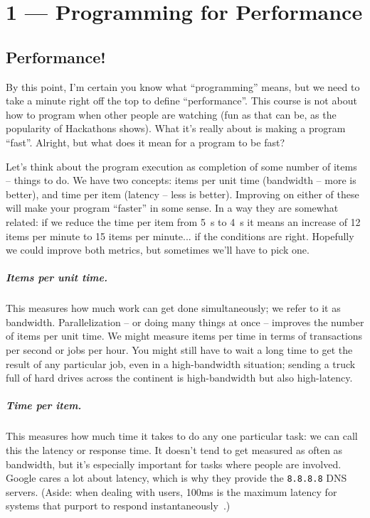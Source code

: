 \documentclass[a4paper]{report}
\begin{document}
\tableofcontents


\chapter*{1 --- Programming for Performance}


\section*{Performance!}
By this point, I'm certain you know what ``programming'' means, but we need to take a minute right off the top to define ``performance''. This course is not about how to program when other people are watching (fun as that can be, as the popularity of Hackathons shows). What it's really about is making a program ``fast''. Alright, but what does it mean for a program to be fast?

Let's think about the program execution as completion of some number of items -- things to do. We have two concepts: items per unit time (bandwidth -- more is better), and time per item (latency -- less is better). Improving on either of these will make your program ``faster'' in some sense. In a way they are somewhat related: if we reduce the time per item from 5~s to 4~s it means an increase of 12 items per minute to 15 items per minute... if the conditions are right. Hopefully we could improve both metrics, but sometimes we'll have to pick one.

\paragraph{Items per unit time.} This measures how much work can get 
done simultaneously; we refer to it as bandwidth.
Parallelization -- or doing many things at once -- improves the number
of items per unit time. We might measure items per time in terms of
transactions per second or jobs per hour. You might still have to wait
a long time to get the result of any particular job, even in a
high-bandwidth situation; sending a truck full of hard drives across
the continent is high-bandwidth but also high-latency.

\paragraph{Time per item.} This measures how much time it takes to do
any one particular task: we can call this the latency or response time.
It doesn't tend to get measured as often as bandwidth, but it's especially
important for tasks where people are involved. Google cares a lot about
latency, which is why they provide the {\tt 8.8.8.8} DNS servers.
(Aside: when dealing with users, 100ms is the maximum latency for
systems that purport to respond instantaneously~\cite{nielsen93:_respon_times}.)
\end{document}
